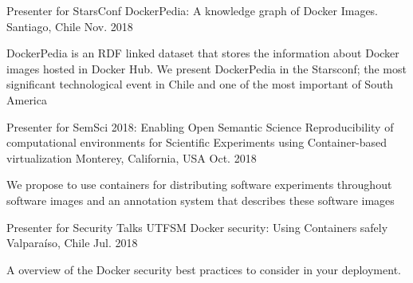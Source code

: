 \begin{cventries}
  \cventry
    {Presenter for StarsConf}
    {DockerPedia: A knowledge graph of Docker Images.}
    {Santiago, Chile}
    {Nov. 2018}
    {
      \begin{cvitems}
        \item {DockerPedia is an RDF linked dataset that stores the information about Docker images hosted in Docker Hub. We present DockerPedia in the Starsconf; the most significant technological event in Chile and one of the most important of South America}
      \end{cvitems}
    }

 \cventry
    {Presenter for SemSci 2018: Enabling Open Semantic Science}
    {Reproducibility of computational environments for Scientific Experiments using Container-based virtualization}
    {Monterey, California, USA}
    {Oct. 2018}
    {
      \begin{cvitems}
        \item {We propose to use containers for  distributing  software  experiments throughout software images and an annotation system that describes these software images}
        \end{cvitems}
    }    



    
  \cventry
    {Presenter for Security Talks UTFSM}
    {Docker security: Using Containers safely}
    {Valparaíso, Chile}
    {Jul. 2018}
    {
      \begin{cvitems}
        \item {A overview of the Docker security best practices to consider in your deployment.}
      \end{cvitems}
    }    
\end{cventries}

